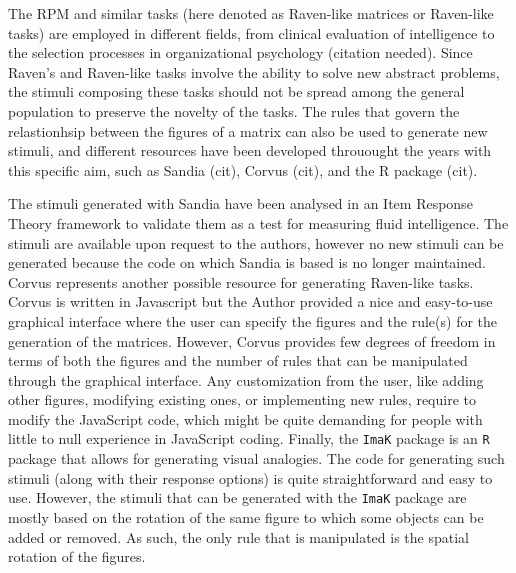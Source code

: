 The RPM and similar tasks (here denoted as Raven-like matrices or Raven-like tasks) are employed in different fields, from clinical evaluation of intelligence to the selection processes in organizational psychology (citation needed).
Since Raven's and Raven-like tasks involve the ability to solve new abstract problems, the stimuli composing these tasks should not be spread among the general population to preserve the novelty of the tasks.
The rules that govern the relastionhsip between the figures of a matrix can also be used to generate new stimuli, and different resources have been developed throuought the years with this specific aim, such as Sandia (cit), Corvus (cit), and the R package  (cit).

The stimuli generated with Sandia have been analysed in an Item Response Theory framework to validate them as a test for measuring fluid intelligence.
The stimuli are available upon request to the authors, however no new stimuli can be generated because the code on which Sandia is based is no longer maintained.
Corvus represents another possible resource for generating Raven-like tasks.
Corvus is written in Javascript but the Author provided a nice and easy-to-use graphical interface where the user can specify the figures and the rule(s) for the generation of the matrices.
However, Corvus provides few degrees of freedom in terms of both the figures and the number of rules that can be manipulated through the graphical interface.
Any customization from the user, like adding other figures, modifying existing ones, or implementing new rules, require to modify the JavaScript code, which might be quite demanding for people with little to null experience in JavaScript coding.
Finally, the \texttt{ImaK} package is an \texttt{R} package that allows for generating visual analogies.
The code for generating such stimuli (along with their response options) is quite straightforward and easy to use.
However, the stimuli that can be generated with the \texttt{ImaK} package are mostly based on the rotation of the same figure to which some objects can be added or removed.
As such, the only rule that is manipulated is the spatial rotation of the figures.

